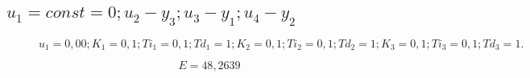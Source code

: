 
\subsection{$u_1 = const = 0; u_2 - y_3; u_3 - y_1; u_4 - y_2$}

%     



\begin{figure}[H]
    \centering
    
    \caption{$u_1 = 0,00; K_1 = 0,1; Ti_1 = 0,1; Td_1 = 1; K_2 = 0,1; Ti_2 = 0,1; Td_2 = 1; K_3 = 0,1; Ti_3 = 0,1; Td_3 = 1.$}
\end{figure}

\begin{equation}
    E = 48,2639
\end{equation}


%     



%     

